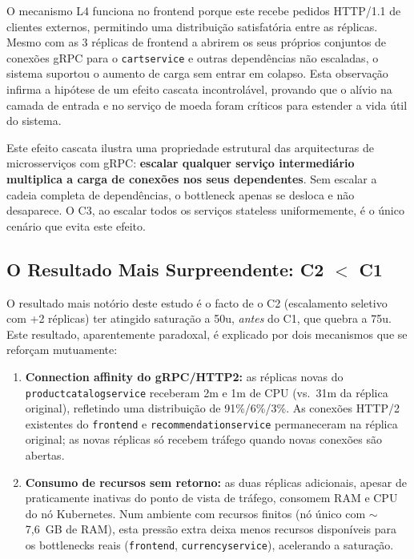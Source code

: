 \documentclass[manuscript,oneside]{acmart}
\begin{document}
O mecanismo L4 funciona no frontend porque este recebe pedidos HTTP/1.1 de clientes externos, permitindo uma distribuição satisfatória entre as réplicas. Mesmo com as 3 réplicas de frontend a abrirem os seus próprios conjuntos de conexões gRPC para o \texttt{cartservice} e outras dependências não escaladas, o sistema suportou o aumento de carga sem entrar em colapso. Esta observação infirma a hipótese de um efeito cascata incontrolável, provando que o alívio na camada de entrada e no serviço de moeda foram críticos para estender a vida útil do sistema.

Este efeito cascata ilustra uma propriedade estrutural das arquitecturas de microsserviços com gRPC: \textbf{escalar qualquer serviço intermediário multiplica a carga de conexões nos seus dependentes}. Sem escalar a cadeia completa de dependências, o bottleneck apenas se desloca e não desaparece. O C3, ao escalar todos os serviços stateless uniformemente, é o único cenário que evita este efeito.

\subsection{O Resultado Mais Surpreendente: C2 $<$ C1}

O resultado mais notório deste estudo é o facto de o C2 (escalamento seletivo com +2 réplicas) ter atingido saturação a 50u, \emph{antes} do C1, que quebra a 75u. Este resultado, aparentemente paradoxal, é explicado por dois mecanismos que se reforçam mutuamente:

\begin{enumerate}
  \item \textbf{Connection affinity do gRPC/HTTP2:} as réplicas novas do \texttt{productcatalogservice} receberam 2m e 1m de CPU (vs.\ 31m da réplica original), refletindo uma distribuição de 91\%/6\%/3\%. As conexões HTTP/2 existentes do \texttt{frontend} e \texttt{recommendationservice} permaneceram na réplica original; as novas réplicas só recebem tráfego quando novas conexões são abertas.

  \item \textbf{Consumo de recursos sem retorno:} as duas réplicas adicionais, apesar de praticamente inativas do ponto de vista de tráfego, consomem RAM e CPU do nó Kubernetes. Num ambiente com recursos finitos (nó único com $\sim$7,6~GB de RAM), esta pressão extra deixa menos recursos disponíveis para os bottlenecks reais (\texttt{frontend}, \texttt{currencyservice}), acelerando a saturação.
\end{enumerate}
\end{document}
